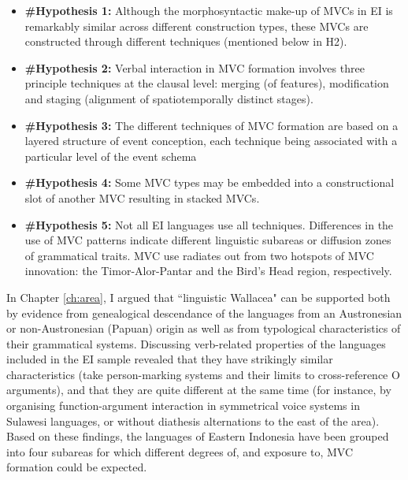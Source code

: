 \begin{footnotesize}
\begin{itemize}
\item \textbf{\#Hypothesis 1:} Although the morphosyntactic make-up of MVCs in EI is remarkably similar across different construction types, these MVCs are constructed through different techniques (mentioned below in H2).
\newpage
\item \textbf{\#Hypothesis 2:} Verbal interaction in MVC formation involves three principle techniques at the clausal level: merging (of features), modification and staging (alignment of spatiotemporally distinct stages).
\item \textbf{\#Hypothesis 3:} The different techniques of MVC formation are based on a layered structure of event conception, each technique being associated with a particular level of the event schema
\item \textbf{\#Hypothesis 4:} Some MVC types may be embedded into a constructional slot of another MVC resulting in stacked MVCs.
\item \textbf{\#Hypothesis 5:} Not all EI languages use all techniques. Differences in the use of MVC patterns indicate different linguistic subareas or diffusion zones of grammatical traits. MVC use radiates out from two hotspots of MVC innovation: the Timor-Alor-Pantar and the Bird's Head region, respectively.
\end{itemize}
\end{footnotesize}

In Chapter \ref{ch:area}, I argued that ``linguistic Wallacea" can be supported both by evidence from genealogical descendance of the languages from an Austronesian or non-Austronesian (Papuan) origin as well as from typological characteristics of their grammatical systems. Discussing verb-related properties of the languages included in the EI sample revealed that they have strikingly similar characteristics (take person-marking systems and their limits to cross-reference O arguments), and that they are quite different at the same time (for instance, by organising function-argument interaction in symmetrical voice systems in Sulawesi languages, or without diathesis alternations to the east of the area). Based on these findings, the languages of Eastern Indonesia have been grouped into four subareas for which different degrees of, and exposure to, MVC formation could be expected. 

